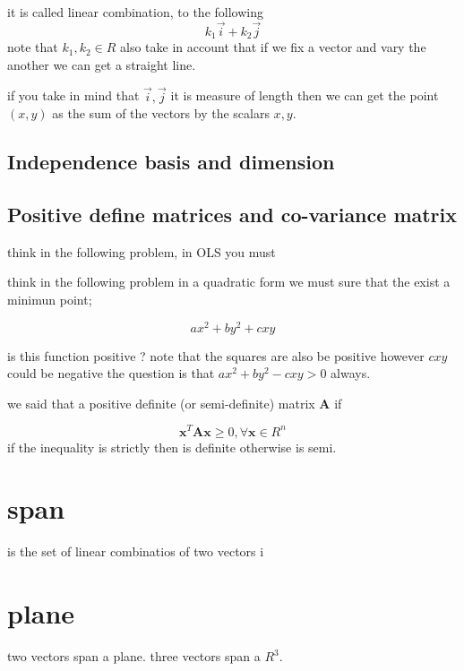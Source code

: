 \documentclass[10pt,a4paper]{article}
\begin{document}
it is called linear combination, to the following 
\begin{equation}
k_{1}\vec{i} + k_{2} \vec{j}
\end{equation}
note that $k_{1},k_{2} \in R$ also take in account that if we  fix a vector and vary the another we can get a straight line.

if you take in mind that $\vec{i},\vec{j}$ it is measure of length then we can get the point $(x,y)$ as the sum of the vectors by the scalars $x,y$.




\subsection{Independence basis and dimension}


\subsection{Positive define matrices and co-variance matrix  }

think in the following problem, in OLS you must 


think in the following problem  in a quadratic form we must sure that the exist a minimun point; 



\begin{equation}
ax^{2}+ by^{2}+cxy
\end{equation}

is this function positive ?
note that the squares are also be positive however $cxy$ could be negative the question is that $ax^{2}+by^{2} - cxy >0$ always.


we said that a positive definite (or semi-definite) matrix $\textbf{A}$ if 

\begin{equation}
\textbf{x}^{T} \textbf{Ax} \geq 0, \forall  \textbf{x} \in R^{n}
\end{equation}
if the inequality is strictly then is definite otherwise is semi.






\section{span}
is the set of linear combinatios of two vectors i


\section{plane}
two vectors span a plane.
three vectors span a $R^{3}$.
\end{document}
